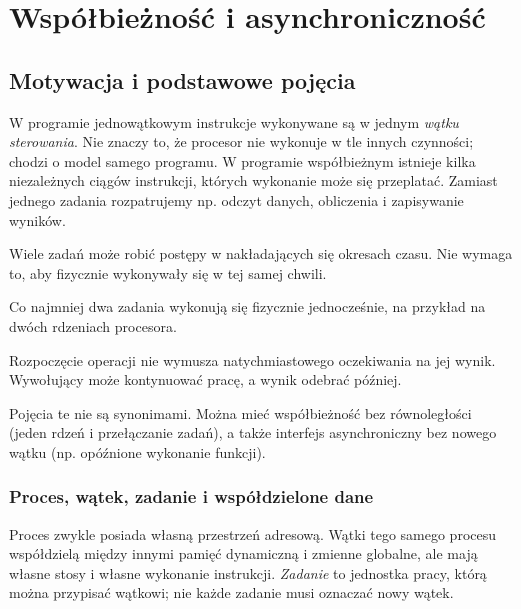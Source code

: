 \chapter{Współbieżność i asynchroniczność}
\label{chap:concurrency}

\section{Motywacja i podstawowe pojęcia}

W programie jednowątkowym instrukcje wykonywane są w jednym \emph{wątku sterowania}.
Nie znaczy to, że procesor nie wykonuje w tle innych czynności; chodzi o model
samego programu. W programie współbieżnym istnieje kilka niezależnych ciągów
instrukcji, których wykonanie może się przeplatać. Zamiast jednego zadania
rozpatrujemy np. odczyt danych, obliczenia i zapisywanie wyników.

\begin{description}[style=nextline]
\item[Współbieżność (\emph{concurrency})]
Wiele zadań może robić postępy w nakładających się okresach czasu.
Nie wymaga to, aby fizycznie wykonywały się w tej samej chwili.
\item[Równoległość (\emph{parallelism})]
Co najmniej dwa zadania wykonują się fizycznie jednocześnie, na przykład
na dwóch rdzeniach procesora.
\item[Asynchroniczność (\emph{asynchrony})]
Rozpoczęcie operacji nie wymusza natychmiastowego oczekiwania na jej wynik.
Wywołujący może kontynuować pracę, a wynik odebrać później.
\end{description}

Pojęcia te nie są synonimami. Można mieć współbieżność bez równoległości
(jeden rdzeń i przełączanie zadań), a także interfejs asynchroniczny bez nowego
wątku (np. opóźnione wykonanie funkcji).


\subsection{Proces, wątek, zadanie i współdzielone dane}

Proces zwykle posiada własną przestrzeń adresową. Wątki tego samego procesu
współdzielą między innymi pamięć dynamiczną i zmienne globalne, ale mają własne
stosy i własne wykonanie instrukcji. \emph{Zadanie} to jednostka pracy,
którą można przypisać wątkowi; nie każde zadanie musi oznaczać nowy wątek.

